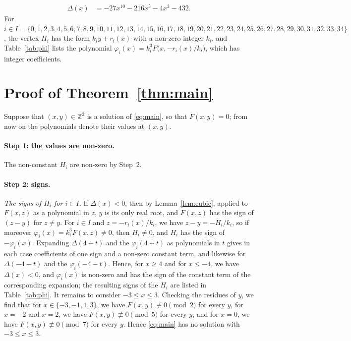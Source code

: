 \documentclass[11pt]{article}
\newcommand{\Z}{\mathbb{Z}}
\begin{document}
\begin{align*}
\Delta(x)&=-27x^{10}-216x^{5}-4x^{3}-432.
\end{align*}
For $i\in I=\{0,\allowbreak 1,\allowbreak 2,\allowbreak 3,\allowbreak 4,\allowbreak 5,\allowbreak 6,\allowbreak 7,\allowbreak 8,\allowbreak 9,\allowbreak 10,\allowbreak 11,\allowbreak 12,\allowbreak 13,\allowbreak 14,\allowbreak 15,\allowbreak 16,\allowbreak 17,\allowbreak 18,\allowbreak 19,\allowbreak 20,\allowbreak 21,\allowbreak 22,\allowbreak 23,\allowbreak 24,\allowbreak 25,\allowbreak 26,\allowbreak 27,\allowbreak 28,\allowbreak 29,\allowbreak 30,\allowbreak 31,\allowbreak 32,\allowbreak 33,\allowbreak 34\}$, the vertex $H_i$ has the form $k_iy+r_i(x)$ with a non-zero integer $k_i$, and Table~\ref{tab:phi} lists the polynomial $\varphi_i(x)=k_i^3F\bigl(x,-r_i(x)/k_i\bigr)$, which has integer coefficients.

\section{Proof of Theorem~\ref{thm:main}}

Suppose that $(x,y)\in\Z^2$ is a solution of \eqref{eq:main}, so that $F(x,y)=0$; from now on the polynomials denote their values at $(x,y)$.
\paragraph{Step 1: the values are non-zero.} The non-constant $H_i$ are non-zero by Step~2.

\paragraph{Step 2: signs.} \emph{The signs of $H_i$ for $i\in I$.} If $\Delta(x)<0$, then by Lemma~\ref{lem:cubic}, applied to $F(x,z)$ as a polynomial in $z$, $y$ is its only real root, and $F(x,z)$ has the sign of $(z-y)$ for $z\neq y$. For $i\in I$ and $z=-r_i(x)/k_i$, we have $z-y=-H_i/k_i$, so if moreover $\varphi_i(x)=k_i^3F(x,z)\neq0$, then $H_i\neq0$, and $H_i$ has the sign of $-\varphi_i(x)$. Expanding $\Delta(4+t)$ and the $\varphi_i(4+t)$ as polynomials in $t$ gives in each case coefficients of one sign and a non-zero constant term, and likewise for $\Delta(-4-t)$ and the $\varphi_i(-4-t)$. Hence, for $x\geq4$ and for $x\leq-4$, we have $\Delta(x)<0$, and $\varphi_i(x)$ is non-zero and has the sign of the constant term of the corresponding expansion; the resulting signs of the $H_i$ are listed in Table~\ref{tab:phi}. It remains to consider $-3\leq x\leq3$. Checking the residues of $y$, we find that for $x\in\{-3,\allowbreak -1,\allowbreak 1,\allowbreak 3\}$, we have $F(x,y)\not\equiv0\pmod{2}$ for every $y$, for $x=-2$ and $x=2$, we have $F(x,y)\not\equiv0\pmod{5}$ for every $y$, and for $x=0$, we have $F(x,y)\not\equiv0\pmod{7}$ for every $y$. Hence \eqref{eq:main} has no solution with $-3\leq x\leq3$.
\end{document}
